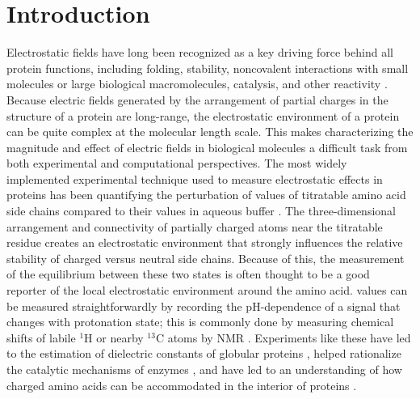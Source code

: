 \section{Introduction} \label{pKa-intro}

Electrostatic fields have long been recognized as a key driving force behind all protein functions, including folding, stability, noncovalent interactions with small molecules or large biological macromolecules, catalysis, and other reactivity \cite{Hayes1976, Warshel1978, Honig1995, Gunner1996, Warshel1998}.
Because electric fields generated by the arrangement of partial charges in the structure of a protein are long-range, the electrostatic environment of a protein can be quite complex at the molecular length scale. 
This makes characterizing the magnitude and effect of electric fields in biological molecules a difficult task from both experimental and computational perspectives. 
The most widely implemented experimental technique used to measure electrostatic effects in proteins has been quantifying the perturbation of \pKa{} values of titratable amino acid side chains compared to their values in aqueous buffer \cite{Forsyth2002, Langsetmo1991, Isom2010, Bradbury1966, Markley1975}.
The three-dimensional arrangement and connectivity of partially charged atoms near the titratable residue creates an electrostatic environment that strongly influences the relative stability of charged versus neutral side chains. 
Because of this, the measurement of the equilibrium between these two states is often thought to be a good reporter of the local electrostatic environment around the amino acid. 
\pKa{} values can be measured straightforwardly by recording the pH-dependence of a signal that changes with protonation state; this is commonly done by measuring chemical shifts of labile $^1$H or nearby $^{13}$C atoms by NMR \cite{Markley1975}. 
Experiments like these have led to the estimation of dielectric constants of globular proteins \cite{Dwyer2000, Chimenti2011}, helped rationalize the catalytic mechanisms of enzymes \cite{Inoue1992, Davoodi1995, McIntosh1996}, and have led to an understanding of how charged amino acids can be accommodated in the interior of proteins \cite{Isom2010, Chimenti2011, Isom2008}.

